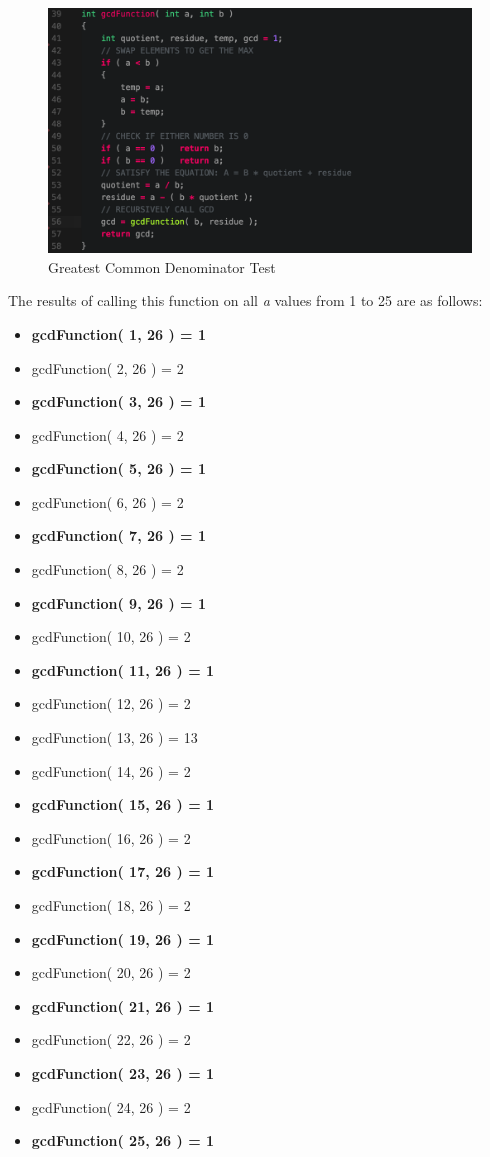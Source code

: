 \documentclass[]{article}
\begin{document}
\begin{figure}[H]
	\includegraphics[width=\textwidth]{gcd.png}
	\caption{Greatest Common Denominator Test}
	\centering
\end{figure}

The results of calling this function on all \textit{a} values from 1 to 25 are as follows:\\

\begin{multicols}{2}
	\begin{itemize}
		\item \textbf{gcdFunction( 1, 26 ) = 1}
		\item gcdFunction( 2, 26 ) = 2
		\item \textbf{gcdFunction( 3, 26 ) = 1}
		\item gcdFunction( 4, 26 ) = 2
		\item \textbf{gcdFunction( 5, 26 ) = 1}
		\item gcdFunction( 6, 26 ) = 2
		\item \textbf{gcdFunction( 7, 26 ) = 1}
		\item gcdFunction( 8, 26 ) = 2
	    \item \textbf{gcdFunction( 9, 26 ) = 1}
		\item gcdFunction( 10, 26 ) = 2
		\item \textbf{gcdFunction( 11, 26 ) = 1}
		\item gcdFunction( 12, 26 ) = 2
		\item gcdFunction( 13, 26 ) = 13
		\item gcdFunction( 14, 26 ) = 2
		\item \textbf{gcdFunction( 15, 26 ) = 1}
		\item gcdFunction( 16, 26 ) = 2
		\item \textbf{gcdFunction( 17, 26 ) = 1}
		\item gcdFunction( 18, 26 ) = 2
		\item \textbf{gcdFunction( 19, 26 ) = 1}
		\item gcdFunction( 20, 26 ) = 2
		\item \textbf{gcdFunction( 21, 26 ) = 1}
		\item gcdFunction( 22, 26 ) = 2	
		\item \textbf{gcdFunction( 23, 26 ) = 1}
		\item gcdFunction( 24, 26 ) = 2
		\item \textbf{gcdFunction( 25, 26 ) = 1}
	\end{itemize}
\end{multicols}
\end{document}
